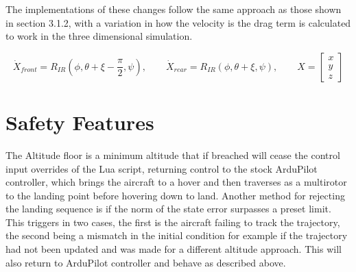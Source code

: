 The implementations of these changes follow the same approach as those shown in section 3.1.2, with a variation in how the velocity is the drag term is calculated to work in the three dimensional simulation.

\begin{equation}
\dot{X}_{front}=R_{IR}(\phi,\theta+\xi-\frac{\pi}{2},\psi), \qquad \dot{X}_{rear}=R_{IR}(\phi,\theta+\xi,\psi), \qquad  {X}=\begin{bmatrix}{x}\\{y}\\{z} \end{bmatrix}
\label{eq:rotor_velocity_sim}
\end{equation}

\section{Safety Features}

The Altitude floor is a minimum altitude that if breached will cease the control input overrides of the Lua script, returning control to the stock ArduPilot controller, which brings the aircraft to a hover and then traverses as a multirotor to the landing point before hovering down to land.
Another method for rejecting the landing sequence is if the norm of the state error surpasses a preset limit. This triggers in two cases, the first is the aircraft failing to track the trajectory, the second being a mismatch in the initial condition for example if the trajectory had not been updated and was made for a different altitude approach. This will also return to ArduPilot controller and behave as described above.


